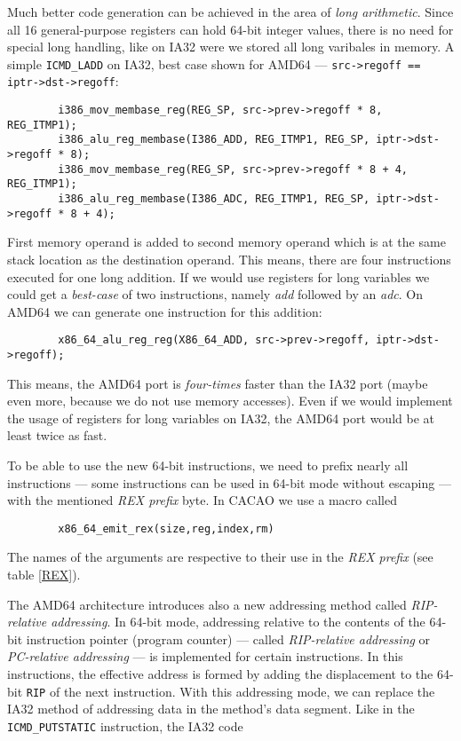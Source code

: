 Much better code generation can be achieved in the area of
\textit{long arithmetic}. Since all 16 general-purpose registers can
hold 64-bit integer values, there is no need for special long
handling, like on IA32 were we stored all long varibales in memory. A
simple \texttt{ICMD\_LADD} on IA32, best case shown for AMD64 ---
\texttt{src->regoff == iptr->dst->regoff}:

\begin{verbatim}
        i386_mov_membase_reg(REG_SP, src->prev->regoff * 8, REG_ITMP1);
        i386_alu_reg_membase(I386_ADD, REG_ITMP1, REG_SP, iptr->dst->regoff * 8);
        i386_mov_membase_reg(REG_SP, src->prev->regoff * 8 + 4, REG_ITMP1);
        i386_alu_reg_membase(I386_ADC, REG_ITMP1, REG_SP, iptr->dst->regoff * 8 + 4);
\end{verbatim}

First memory operand is added to second memory operand which is at the
same stack location as the destination operand. This means, there are
four instructions executed for one long addition. If we would use
registers for long variables we could get a \textit{best-case} of two
instructions, namely \textit{add} followed by an \textit{adc}. On
AMD64 we can generate one instruction for this addition:

\begin{verbatim}
        x86_64_alu_reg_reg(X86_64_ADD, src->prev->regoff, iptr->dst->regoff);
\end{verbatim}

This means, the AMD64 port is \textit{four-times} faster than the IA32
port (maybe even more, because we do not use memory accesses). Even if
we would implement the usage of registers for long variables on IA32,
the AMD64 port would be at least twice as fast.

To be able to use the new 64-bit instructions, we need to prefix
nearly all instructions --- some instructions can be used in 64-bit
mode without escaping --- with the mentioned \textit{REX prefix}
byte. In CACAO we use a macro called

\begin{verbatim}
        x86_64_emit_rex(size,reg,index,rm)
\end{verbatim}

The names of the arguments are respective to their use in the
\textit{REX prefix} (see table \ref{REX}).

The AMD64 architecture introduces also a new addressing method called
\textit{RIP-relative addressing}. In 64-bit mode, addressing relative
to the contents of the 64-bit instruction pointer (program counter)
--- called \textit{RIP-relative addressing} or \textit{PC-relative
addressing} --- is implemented for certain instructions. In this
instructions, the effective address is formed by adding the
displacement to the 64-bit \texttt{RIP} of the next instruction. With
this addressing mode, we can replace the IA32 method of addressing
data in the method's data segment. Like in the
\texttt{ICMD\_PUTSTATIC} instruction, the IA32 code

